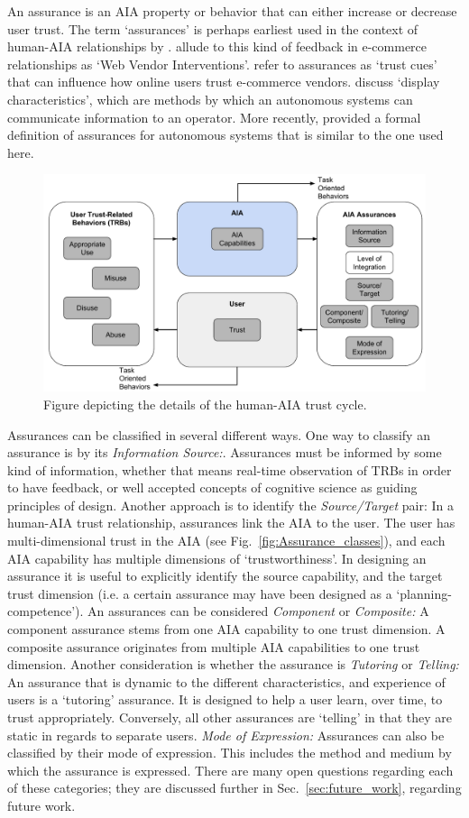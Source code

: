 An assurance is an AIA property or behavior that can either increase or decrease user trust. The term `assurances' is perhaps earliest used in the context of human-AIA relationships by \citet{Sheridan1984-kx}. \citet{McKnight2001-fa} allude to this kind of feedback in e-commerce relationships as `Web Vendor Interventions'. \citet{Corritore2003-gx} refer to assurances as `trust cues' that can influence how online users trust e-commerce vendors. \citet{Lee2004-pv} discuss `display characteristics', which are methods by which an autonomous systems can communicate information to an operator. More recently, \citet{Lillard2016-yg} provided a formal definition of assurances for autonomous systems that is similar to the one used here. 

\begin{figure}[t]%
    \centering
    \includegraphics[width=0.6\linewidth]{Figures/RefinedTrust_one_way.pdf}
    \caption{Figure depicting the details of the human-AIA trust cycle.}
    \label{fig:refined_trust}
\end{figure}

Assurances can be classified in several different ways. One way to classify an assurance is by its \emph{Information Source:}. Assurances must be informed by some kind of information, whether that means real-time observation of TRBs in order to have feedback, or well accepted concepts of cognitive science as guiding principles of design.
Another approach is to identify the \emph{Source/Target} pair: In a human-AIA trust relationship, assurances link the AIA to the user. The user has multi-dimensional trust in the AIA (see Fig.~\ref{fig:Assurance_classes}), and each AIA capability has multiple dimensions of `trustworthiness'. In designing an assurance it is useful to explicitly identify the source capability, and the target trust dimension (i.e. a certain assurance may have been designed as a `planning-competence').
An assurances can be considered \emph{Component} or \emph{Composite:} A component assurance stems from one AIA capability to one trust dimension. A composite assurance originates from multiple AIA capabilities to one trust dimension.
Another consideration is whether the assurance is \emph{Tutoring} or \emph{Telling:} An assurance that is dynamic to the different characteristics, and experience of users is a `tutoring' assurance. It is designed to help a user learn, over time, to trust appropriately. Conversely, all other assurances are `telling' in that they are static in regards to separate users.
\emph{Mode of Expression:} Assurances can also be classified by their mode of expression. This includes the method and medium by which the assurance is expressed.
There are many open questions regarding each of these categories; they are discussed further in Sec.~\ref{sec:future_work}, regarding future work.

